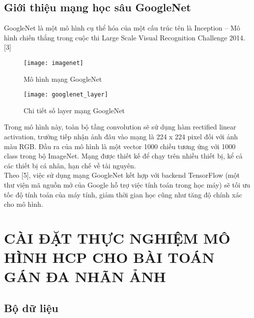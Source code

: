 \documentclass[13pt, a4paper]{extreport}
\begin{document}
\section{Giới thiệu mạng học sâu GoogleNet}
\indent GoogleNet là một mô hình cụ thể hóa của một cấu trúc tên là Inception – Mô hình chiến thắng trong cuộc thi Large Scale Visual Recognition Challenge 2014.[3]

\begin{figure}[H]
  \centering
    \texttt{[image: imagenet]}
   \caption{\large Mô hình mạng GoogleNet}
\end{figure}

\begin{figure}[H]
  \centering
    \texttt{[image: googlenet\_layer]}
   \caption{\large Chi tiết số layer mạng GoogleNet}
\end{figure}
\newpage
\indent Trong mô hình này, toàn bộ tầng convolution sẽ sử dụng hàm rectified linear activation, trường tiếp nhận ảnh đâu vào mạng là 224 x 224 pixel đối với ảnh màu RGB. Đầu ra của mô hình là một vector 1000 chiều tương ứng với 1000 class trong bộ ImageNet. Mạng được thiết kế để chạy trên nhiều thiết bị, kể cả các thiết bị cá nhân, hạn chế về tài nguyên.\\
\indent Theo [5], việc sử dụng mạng GoogleNet kết hợp với backend TensorFlow (một thư viện mã nguồn mở của Google hỗ trợ việc tính toán trong học máy) sẽ tối ưu tốc độ tính toán của máy tính, giảm thời gian học cũng như tăng độ chính xác cho mô hình.
\chapter{CÀI ĐẶT THỰC NGHIỆM MÔ HÌNH HCP \newline \hspace*{3.4cm} CHO BÀI TOÁN GÁN ĐA NHÃN ẢNH}
\section{Bộ dữ liệu}
\end{document}
